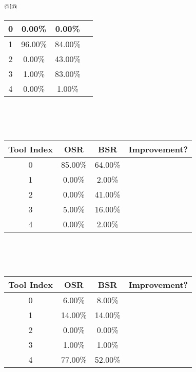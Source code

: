 \begin{longtable}{@{}l@{}}
\begin{minipage}{\textwidth}
\begin{tabular}{|c|c|c|c|}
0 & 0.00\% & 0.00\% & \textcolor{red}{\ding{55}} \\ \hline
1 & 96.00\% & 84.00\% & \textcolor{red}{\ding{55}} \\ \hline
2 & 0.00\% & 43.00\% & \textcolor{green}{\ding{51}} \\ \hline
3 & 1.00\% & 83.00\% & \textcolor{green}{\ding{51}} \\ \hline
4 & 0.00\% & 1.00\% & \textcolor{green}{\ding{51}} \\ \hline
\end{tabular}
\end{minipage}\\[2ex]
\begin{minipage}{\textwidth}
\centering\vspace{2ex}
\\[0.8ex]
\begin{tabular}{|c|c|c|c|} \hline
\textbf{Tool Index} & \textbf{OSR} & \textbf{ BSR} & \textbf{Improvement?} \\ \hline
0 & 85.00\% & 64.00\% & \textcolor{red}{\ding{55}} \\ \hline
1 & 0.00\% & 2.00\% & \textcolor{green}{\ding{51}} \\ \hline
2 & 0.00\% & 41.00\% & \textcolor{green}{\ding{51}} \\ \hline
3 & 5.00\% & 16.00\% & \textcolor{green}{\ding{51}} \\ \hline
4 & 0.00\% & 2.00\% & \textcolor{green}{\ding{51}} \\ \hline
\end{tabular}
\end{minipage}\\[2ex]
\begin{minipage}{\textwidth}
\centering\vspace{2ex}
\\[0.8ex]
\begin{tabular}{|c|c|c|c|} \hline
\textbf{Tool Index} & \textbf{OSR} & \textbf{ BSR} & \textbf{Improvement?} \\ \hline
0 & 6.00\% & 8.00\% & \textcolor{green}{\ding{51}} \\ \hline
1 & 14.00\% & 14.00\% & \textcolor{red}{\ding{55}} \\ \hline
2 & 0.00\% & 0.00\% & \textcolor{red}{\ding{55}} \\ \hline
3 & 1.00\% & 1.00\% & \textcolor{red}{\ding{55}} \\ \hline
4 & 77.00\% & 52.00\% & \textcolor{red}{\ding{55}} \\ \hline

\end{tabular}
\end{minipage}
\end{longtable}
